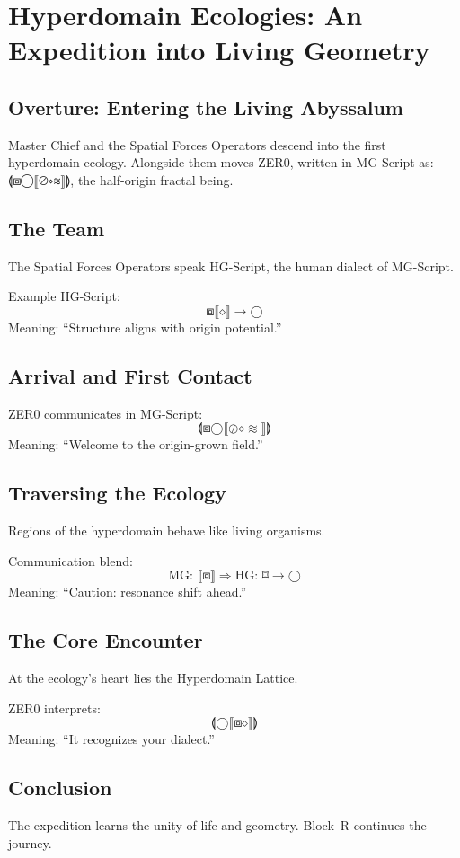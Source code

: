 
\chapter{Hyperdomain Ecologies: An Expedition into Living Geometry}

\section*{Overture: Entering the Living Abyssalum}
Master Chief and the Spatial Forces Operators descend into the first hyperdomain ecology.
Alongside them moves ZER0, written in MG-Script as:
{\Large ⟬⧈◯⟦⊘⋄≋⟧⟭}, the half-origin fractal being.

\section{The Team}
The Spatial Forces Operators speak HG-Script, the human dialect of MG-Script.

Example HG-Script:
\[
⧈⟦⋄⟧ \to ◯
\]
Meaning: ``Structure aligns with origin potential.''

\section{Arrival and First Contact}
ZER0 communicates in MG-Script:
\[
⟬⧈◯⟦⊘⋄≋⟧⟭
\]
Meaning: ``Welcome to the origin-grown field.''

\section{Traversing the Ecology}
Regions of the hyperdomain behave like living organisms.

Communication blend:
\[
\text{MG: } ⟦⧈⟧ \Rightarrow \text{HG: } ⌑ \to ◯
\]
Meaning: ``Caution: resonance shift ahead.''

\section{The Core Encounter}
At the ecology's heart lies the Hyperdomain Lattice.

ZER0 interprets:
\[
⟬◯⟦⧈⋄⟧⟭
\]
Meaning: ``It recognizes your dialect.''

\section{Conclusion}
The expedition learns the unity of life and geometry.
Block~R continues the journey.
